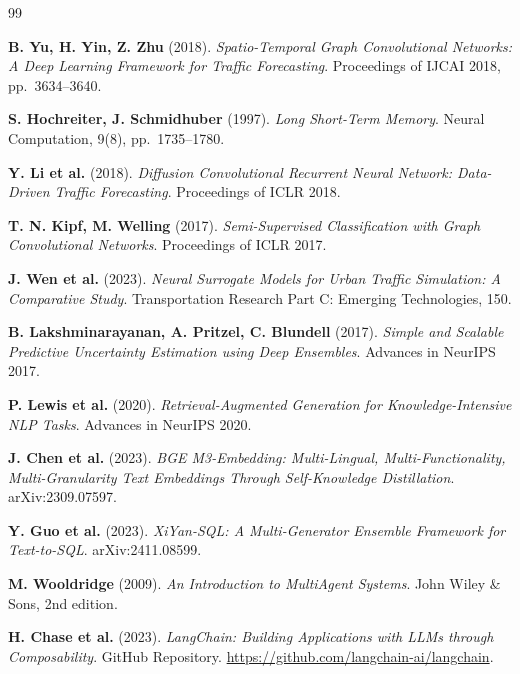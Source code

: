 \documentclass[12pt,a4paper]{report}
\begin{document}
\newpage
{}
\begin{thebibliography}{99}

\textbf{B. Yu, H. Yin, Z. Zhu} (2018).
\textit{Spatio-Temporal Graph Convolutional Networks: A Deep Learning Framework for Traffic Forecasting}.
Proceedings of IJCAI 2018, pp.~3634--3640.

\textbf{S. Hochreiter, J. Schmidhuber} (1997).
\textit{Long Short-Term Memory}.
Neural Computation, 9(8), pp.~1735--1780.

\textbf{Y. Li et al.} (2018).
\textit{Diffusion Convolutional Recurrent Neural Network: Data-Driven Traffic Forecasting}.
Proceedings of ICLR 2018.

\textbf{T. N. Kipf, M. Welling} (2017).
\textit{Semi-Supervised Classification with Graph Convolutional Networks}.
Proceedings of ICLR 2017.

\textbf{J. Wen et al.} (2023).
\textit{Neural Surrogate Models for Urban Traffic Simulation: A Comparative Study}.
Transportation Research Part C: Emerging Technologies, 150.

\textbf{B. Lakshminarayanan, A. Pritzel, C. Blundell} (2017).
\textit{Simple and Scalable Predictive Uncertainty Estimation using Deep Ensembles}.
Advances in NeurIPS 2017.

\textbf{P. Lewis et al.} (2020).
\textit{Retrieval-Augmented Generation for Knowledge-Intensive NLP Tasks}.
Advances in NeurIPS 2020.

\textbf{J. Chen et al.} (2023).
\textit{BGE M3-Embedding: Multi-Lingual, Multi-Functionality, Multi-Granularity Text Embeddings Through Self-Knowledge Distillation}.
arXiv:2309.07597.

\textbf{Y. Guo et al.} (2023).
\textit{XiYan-SQL: A Multi-Generator Ensemble Framework for Text-to-SQL}.
arXiv:2411.08599.

\textbf{M. Wooldridge} (2009).
\textit{An Introduction to MultiAgent Systems}.
John Wiley \& Sons, 2nd edition.

\textbf{H. Chase et al.} (2023).
\textit{LangChain: Building Applications with LLMs through Composability}.
GitHub Repository. \url{https://github.com/langchain-ai/langchain}.


\end{thebibliography}
\end{document}
